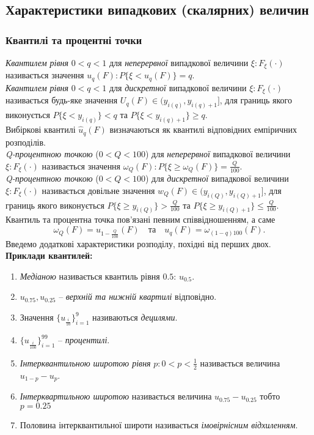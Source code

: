 \subsection{Характеристики випадкових (скалярних) величин}
\subsubsection{Квантилі та процентні точки}
\textit{Квантилем рівня} $0 < q < 1$ для \textit{неперервної} випадкової величини $\xi: F_\xi(\cdot)$ називається значення $u_q(F): P\{ \xi < u_q(F)\}=q$. \\

\textit{Квантилем рівня} $0 < q < 1$ для \textit{дискретної} випадкової величини $\xi: F_\xi(\cdot)$ називається будь-яке значення $U_q(F)\in (y_{i(q)}, y_{i(q)+1}]$, для границь якого виконується $P\{ \xi < y_{i(q)}\} < q$ та $P\{ \xi < y_{i(q) + 1}\} \ge q$. \\

Вибіркові квантилі $\widehat{u}_q(F)$ визначаються як квантилі відповідних емпіричних розподілів. \\

\textit{Q-процентною точкою} ($0 < Q <100$) для \textit{неперервної} випадкової величини $\xi: F_\xi(\cdot)$ називається значення $\omega_Q(F): P\{ \xi \ge \omega_Q(F) \} = \frac{Q}{100}$. \\

\textit{Q-процентною точкою} ($0 < Q <100$) для \textit{дискретної} випадкової величини $\xi: F_\xi(\cdot)$ називається довільне значення $w_Q(F) \in (y_{i(Q)}, y_{i(Q)+1}]$, для границь якого виконується $P\{ \xi \ge y_{i(Q)}\} > \frac{Q}{100}$ та $P\{ \xi \ge y_{i(Q)+1}\} \le \frac{Q}{100}$. \\

Квантиль та процентна точка пов'язані певним співвідношенням, а саме \[\omega_Q(F)=u_{1-\frac{Q}{100}}(F)\quad\text{та} \quad u_q(F) = \omega_{(1-q)100}(F). \]
Введемо додаткові характеристики розподілу, похідні від перших двох. \\

\textbf{Приклади квантилей:}
\begin{enumerate}
	\item \textit{Медіаною} називається квантиль рівня $0.5$: $u_{0.5}$.
	\item $u_{0.75}, u_{0.25}$ -- \textit{верхній та нижній квартилі} відповідно.
	\item Значення $\{ u_{\frac{i}{10}}\}_{i=1}^9$ називаються \textit{децилями}.
	\item $\{ u_{\frac{i}{100}}\}_{i=1}^{99}$ -- \textit{процентилі}.
	\item \textit{Інтерквантильною широтою рівня} $p: 0 < p < \frac{1}{2}$ називається величина $u_{1-p}-u_p$.
	\item \textit{Інтерквартильною широтою} називається величина $u_{0.75} - u_{0.25}$ тобто $p = 0.25$ 
	\item Половина інтерквантильної широти називається \textit{імовірнісним відхиленням}.
\end{enumerate}
